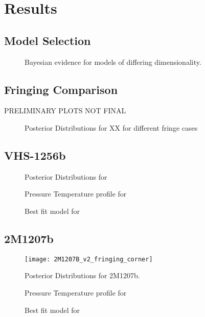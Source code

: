 \section{Results}
\subsection{Model Selection}
\begin{figure}[h]
	\caption{Bayesian evidence for models of differing dimensionality.}
	\label{fig:bicdim}
\end{figure}
\subsection{Fringing Comparison}
PRELIMINARY PLOTS NOT FINAL
\begin{figure}[h]
	\caption{Posterior Distributions for XX for different fringe cases}
	\label{fig:postfringe}
\end{figure}
\subsection{VHS-1256b}
\begin{figure}[h]
	\caption{Posterior Distributions for}
	\label{fig:postVHS}
\end{figure}
\begin{figure}[h]
	\caption{Pressure Temperature profile for}
	\label{fig:presVHS}
\end{figure}
\begin{figure}[h]
	\caption{Best fit model for}
	\label{fig:bestfitVHS}
\end{figure}

\subsection{2M1207b}
\begin{figure}[h]
	\texttt{[image: 2M1207B\_v2\_fringing\_corner]}
	\caption{Posterior Distributions for 2M1207b.}
	\label{fig:post2M}
\end{figure}
\begin{figure}[h]
	\caption{Pressure Temperature profile for}
	\label{fig:pres2M}
\end{figure}
\begin{figure}[h]
	\caption{Best fit model for}
	\label{fig:bestfit2M}
\end{figure}

